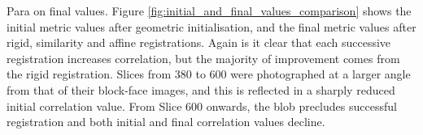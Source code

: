 	Para on final values.
	Figure \ref{fig:initial_and_final_values_comparison} shows the initial metric values after geometric initialisation, and the final metric values after rigid, similarity and affine registrations. Again is it clear that each successive registration increases correlation, but the majority of improvement comes from the rigid registration. Slices from 380 to 600 were photographed at a larger angle from that of their block-face images, and this is reflected in a sharply reduced initial correlation value. From Slice 600 onwards, the blob precludes successful registration and both initial and final correlation values decline.
	
	\begin{figure}[htbp]
    \centering

\end{figure}
